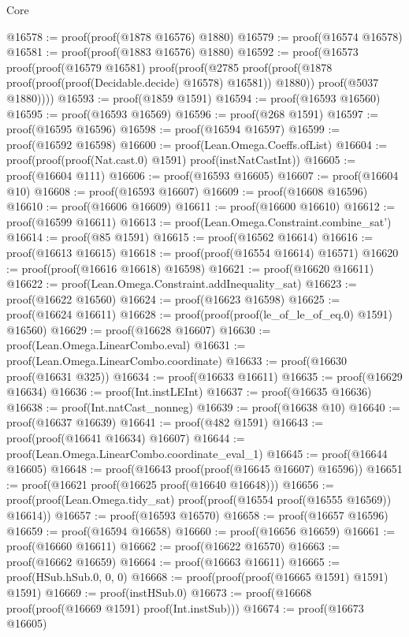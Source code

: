 \begin{lexlean}{Core}
\begin{coremodule}
@16578 := proof(proof(@1878 @16576) @1880)
@16579 := proof(@16574 @16578)
@16581 := proof(proof(@1883 @16576) @1880)
@16592 := proof(@16573
      proof(proof(@16579 @16581)
          proof(proof(@2785
                proof(proof(@1878 proof(proof(proof(Decidable.decide) @16578) @16581)) @1880))
              proof(@5037 @1880))))
@16593 := proof(@1859 @1591)
@16594 := proof(@16593 @16560)
@16595 := proof(@16593 @16569)
@16596 := proof(@268 @1591)
@16597 := proof(@16595 @16596)
@16598 := proof(@16594 @16597)
@16599 := proof(@16592 @16598)
@16600 := proof(Lean.Omega.Coeffs.ofList)
@16604 := proof(proof(proof(Nat.cast.{0}) @1591) proof(instNatCastInt))
@16605 := proof(@16604 @111)
@16606 := proof(@16593 @16605)
@16607 := proof(@16604 @10)
@16608 := proof(@16593 @16607)
@16609 := proof(@16608 @16596)
@16610 := proof(@16606 @16609)
@16611 := proof(@16600 @16610)
@16612 := proof(@16599 @16611)
@16613 := proof(Lean.Omega.Constraint.combine_sat')
@16614 := proof(@85 @1591)
@16615 := proof(@16562 @16614)
@16616 := proof(@16613 @16615)
@16618 := proof(proof(@16554 @16614) @16571)
@16620 := proof(proof(@16616 @16618) @16598)
@16621 := proof(@16620 @16611)
@16622 := proof(Lean.Omega.Constraint.addInequality_sat)
@16623 := proof(@16622 @16560)
@16624 := proof(@16623 @16598)
@16625 := proof(@16624 @16611)
@16628 := proof(proof(proof(le_of_le_of_eq.{0}) @1591) @16560)
@16629 := proof(@16628 @16607)
@16630 := proof(Lean.Omega.LinearCombo.eval)
@16631 := proof(Lean.Omega.LinearCombo.coordinate)
@16633 := proof(@16630 proof(@16631 @325))
@16634 := proof(@16633 @16611)
@16635 := proof(@16629 @16634)
@16636 := proof(Int.instLEInt)
@16637 := proof(@16635 @16636)
@16638 := proof(Int.natCast_nonneg)
@16639 := proof(@16638 @10)
@16640 := proof(@16637 @16639)
@16641 := proof(@482 @1591)
@16643 := proof(proof(@16641 @16634) @16607)
@16644 := proof(Lean.Omega.LinearCombo.coordinate_eval_1)
@16645 := proof(@16644 @16605)
@16648 := proof(@16643 proof(proof(@16645 @16607) @16596))
@16651 := proof(@16621 proof(@16625 proof(@16640 @16648)))
@16656 := proof(proof(Lean.Omega.tidy_sat) proof(proof(@16554 proof(@16555 @16569)) @16614))
@16657 := proof(@16593 @16570)
@16658 := proof(@16657 @16596)
@16659 := proof(@16594 @16658)
@16660 := proof(@16656 @16659)
@16661 := proof(@16660 @16611)
@16662 := proof(@16622 @16570)
@16663 := proof(@16662 @16659)
@16664 := proof(@16663 @16611)
@16665 := proof(HSub.hSub.{0, 0, 0})
@16668 := proof(proof(proof(@16665 @1591) @1591) @1591)
@16669 := proof(instHSub.{0})
@16673 := proof(@16668 proof(proof(@16669 @1591) proof(Int.instSub)))
@16674 := proof(@16673 @16605)

\end{coremodule}
\end{lexlean}
